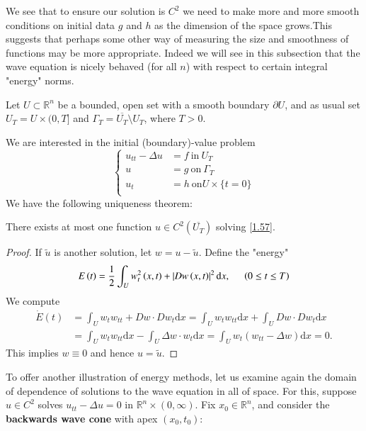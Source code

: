 We see that to ensure our solution is $C^2$ we need to make more and more smooth conditions on initial data $g$ and $h$ as the dimension of the space grows.This suggests that perhaps some other way of measuring the size and smoothness of functions may be more appropriate. Indeed we will see in this subsection that the wave equation is nicely behaved (for all $n$) with respect to certain integral "energy" norms.\par
Let $U\subset\mathbb{R}^n$ be a bounded, open set with a smooth boundary $\partial U$, and as usual set $U_T=U\times (0,T]$ and $\Gamma_T=\overline{U_T}\setminus U_T$, where $T>0$.\par
We are interested in the initial (boundary)-value problem
\begin{equation}\label{1.57}
\left\{ \begin{aligned}
	u_{tt}-\Delta u&=f\ \text{in}\ U_T\\
	u&=g\ \text{on}\ \Gamma_T\\
	u_t&=h\ \text{on} U\times\{t=0\}\\
\end{aligned} \right. 
\end{equation}
We have the following uniqueness theorem: 
\begin{theorem}
There exists at most one function $u\in C^2(\overline{U_T})$ solving \eqref{1.57}.
\end{theorem}
\begin{proof}
If $\widetilde{u}$ is another solution, let $w=u-\widetilde{u}$. Define the "energy" 
$$
E\left( t \right) =\frac{1}{2}\int_U{w_{t}^{2}\left( x,t \right) +\left| Dw\left( x,t \right) \right|^2\mathrm{d}x},\hspace{0.5cm}\left( 0\le t\le T \right) 
$$
We compute 
$$
\begin{aligned}
\dot{E}\left( t \right) &=\int_U{w_tw_{tt}+Dw\cdot Dw_t\mathrm{d}x}=\int_U{w_tw_{tt}\mathrm{d}x}+\int_U{Dw\cdot Dw_t\mathrm{d}x}
\\
&=\int_U{w_tw_{tt}\mathrm{d}x}-\int_U{\Delta w\cdot w_t\mathrm{d}x}=\int_U{w_t\left( w_{tt}-\Delta w \right) \mathrm{d}x}=0.
\end{aligned}
$$
This implies $w\equiv 0$ and hence $u=\widetilde{u}$.
\end{proof}
To offer another illustration of energy methods, let us examine again the domain of dependence of solutions to the wave equation in all of space. For this, suppose $u\in C^2$ solves $u_{tt}-\Delta u=0$ in $\mathbb{R}^n\times(0,\infty)$. Fix $x_0\in\mathbb{R}^n$, and consider the \textbf{backwards wave cone} with apex $(x_0,t_0)$: 

